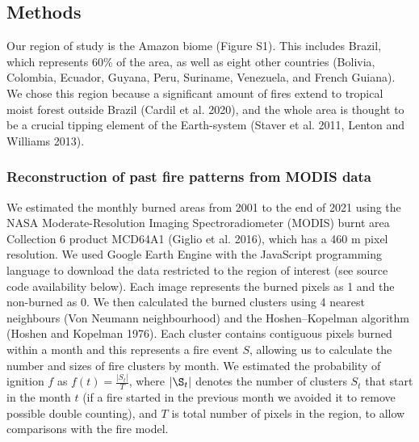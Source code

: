 \documentclass[
]{article}
\begin{document}
\subsection{Methods}\label{methods}

Our region of study is the Amazon biome (Figure S1). This includes
Brazil, which represents 60\% of the area, as well as eight other
countries (Bolivia, Colombia, Ecuador, Guyana, Peru, Suriname,
Venezuela, and French Guiana). We chose this region because a
significant amount of fires extend to tropical moist forest outside
Brazil (Cardil et al. 2020), and the whole area is thought to be a
crucial tipping element of the Earth-system (Staver et al. 2011, Lenton
and Williams 2013).

\subsubsection{Reconstruction of past fire patterns from MODIS
data}\label{reconstruction-of-past-fire-patterns-from-modis-data}

We estimated the monthly burned areas from 2001 to the end of 2021 using
the NASA Moderate-Resolution Imaging Spectroradiometer (MODIS) burnt
area Collection 6 product MCD64A1 (Giglio et al. 2016), which has a 460
m pixel resolution. We used Google Earth Engine with the JavaScript
programming language to download the data restricted to the region of
interest (see source code availability below). Each image represents the
burned pixels as 1 and the non-burned as 0. We then calculated the
burned clusters using 4 nearest neighbours (Von Neumann neighbourhood)
and the Hoshen--Kopelman algorithm (Hoshen and Kopelman 1976). Each
cluster contains contiguous pixels burned within a month and this
represents a fire event \(S\), allowing us to calculate the number and
sizes of fire clusters by month. We estimated the probability of
ignition \(f\) as \(f(t) = \frac{|S_t|}{T}\), where \(|\S_t|\) denotes
the number of clusters \(S_t\) that start in the month \(t\) (if a fire
started in the previous month we avoided it to remove possible double
counting), and \(T\) is total number of pixels in the region, to allow
comparisons with the fire model.
\end{document}
